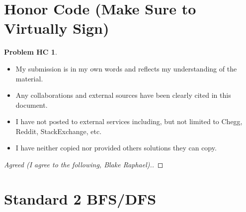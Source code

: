 \documentclass[11pt]{article}
\theoremstyle{definition}
\theoremstyle{definition}
\newtheorem*{requiredHC}{Problem HC}
\theoremstyle{definition}
\begin{document}
\newpage
\section*{Honor Code (Make Sure to Virtually Sign)} \label{HonorCode}
\hypertarget{HonorCode}{}

\begin{requiredHC}
\begin{itemize}
\item My submission is in my own words and reflects my understanding of the material.
\item Any collaborations and external sources have been clearly cited in this document.
\item I have not posted to external services including, but not limited to Chegg, Reddit, StackExchange, etc.
\item I have neither copied nor provided others solutions they can copy.
\end{itemize}

\end{requiredHC}

\begin{proof}[Agreed (I agree to the following, Blake Raphael).]
\end{proof}


\newpage
\setcounter{section}{1}
\section{Standard 2 BFS/DFS}
\end{document}
